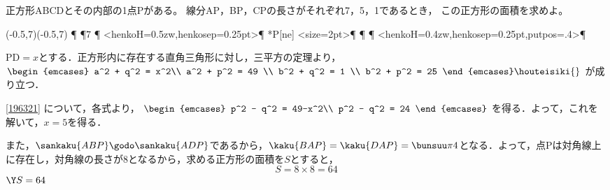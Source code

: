 \begin{problem}
  正方形ABCDとその内部の1点Pがある。
線分AP，BP，CPの長さがそれぞれ7，5，1であるとき，
この正方形の面積を求めよ。
\end{problem}

\begin{mawarikomi}{}{%
\begin{pszahyou*}[ul=8mm](-0.5,7)(-0.5,7)
  \Takakkei{\A\B\C\D}
  \CandC{}\F\P
  \Drawline{\P\A}
  \Drawline{\B\P}
  \Drawline{\C\P}
  \HenKo\A\P{$7$}
  \HenKo\P{}
  \HenKo<henkoH=0.5zw,henkosep=0.25pt>\P{}
  \tenretu**{P[ne]}
  \Kuromaru<size=2pt>\P
  \Suisen\P\A\D\Q
  \HenKo\Q{}
  \HenKo\D{}
  \Hasen{\P\Q}
  \Suisen\P\C\D\R
  \HenKo\R{}
  \HenKo\C{}
  \Hasen{\P\R}
  \Drawline{\P\D}
  \HenKo<henkoH=0.4zw,henkosep=0.25pt,putpos=.4>\P{}
\end{pszahyou*}
}

$\mathrm{PD} = x$とする．正方形内に存在する直角三角形に対し，三平方の定理より，
$\begin{emcases}
  a^2 + q^2 = x^2\\
  a^2 + p^2 = 49 \\
  b^2 + q^2 = 1 \\
  b^2 + p^2 = 25
\end{emcases}\houteisiki{\label{196321}}$
が成り立つ．

\eqref{196321} について，各式より，
$\begin{emcases}
  p^2 - q^2 = 49-x^2\\
  p^2 - q^2 = 24
\end{emcases}$
を得る．よって，これを解いて，$x=5$を得る．

また，$\sankaku{ABP}\godo\sankaku{ADP}$であるから，$\kaku{BAP} = \kaku{DAP} = \bunsuu\pi4$となる．よって，点Pは対角線上に存在し，対角線の長さが8となるから，求める正方形の面積を$S$とすると，
\[S = 8 \times 8 = 64\]
\hfill$\Y S=64$

\end{mawarikomi}
